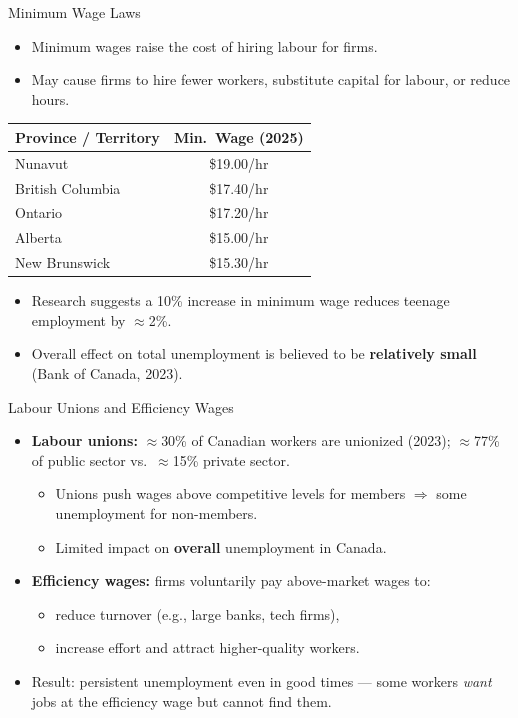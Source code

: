 \documentclass[aspectratio=169]{beamer}
\begin{document}
\begin{frame}{Minimum Wage Laws}
\transfade
\begin{itemize}[<+->]
  \item Minimum wages raise the cost of hiring labour for firms.
  \item May cause firms to hire fewer workers, substitute capital for labour, or reduce hours.
\end{itemize}
\vspace{0.3em}
\begin{center}
\renewcommand{\arraystretch}{1.3}
\small
\begin{tabular}{lc}
\toprule
\textbf{Province / Territory} & \textbf{Min.\ Wage (2025)} \\
\midrule
Nunavut & \$19.00/hr \\
British Columbia & \$17.40/hr \\
Ontario & \$17.20/hr \\
Alberta & \$15.00/hr \\
New Brunswick & \$15.30/hr \\
\bottomrule
\end{tabular}
\end{center}
\begin{itemize}[<+->]
  \item Research suggests a 10\% increase in minimum wage reduces teenage employment by $\approx$2\%.
  \item Overall effect on total unemployment is believed to be \textbf{relatively small} (Bank of Canada, 2023).
\end{itemize}
\end{frame}

\begin{frame}{Labour Unions and Efficiency Wages}
\transfade
\begin{itemize}[<+->]
  \item \textbf{Labour unions:} $\approx$30\% of Canadian workers are unionized (2023); $\approx$77\% of public sector vs.\ $\approx$15\% private sector.
  \begin{itemize}[<+->]
    \item Unions push wages above competitive levels for members $\Rightarrow$ some unemployment for non-members.
    \item Limited impact on \textbf{overall} unemployment in Canada.
  \end{itemize}
  \item \textbf{Efficiency wages:} firms voluntarily pay above-market wages to:
  \begin{itemize}[<+->]
    \item reduce turnover (e.g., large banks, tech firms),
    \item increase effort and attract higher-quality workers.
  \end{itemize}
  \item Result: persistent unemployment even in good times --- some workers \emph{want} jobs at the efficiency wage but cannot find them.
\end{itemize}
\end{frame}
\end{document}
